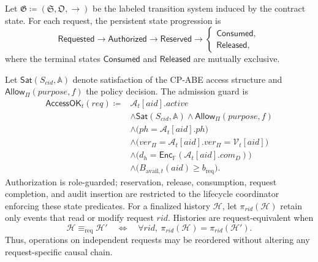 \documentclass[10pt,journal,compsoc]{IEEEtran}
\begin{document}
Let \(\mathfrak{G}\coloneqq(\mathfrak{S},\mathfrak{O},\longrightarrow)\) be the labeled transition system induced by the contract state. For each request, the persistent state progression is
\begin{equation}
\mathsf{Requested}\longrightarrow\mathsf{Authorized}\longrightarrow\mathsf{Reserved}
\longrightarrow
\begin{cases}
\mathsf{Consumed},\\
\mathsf{Released},
\end{cases}
\label{eq:request_state_machine}
\end{equation}
where the terminal states $\mathsf{Consumed}$ and $\mathsf{Released}$ are mutually exclusive.

Let $\mathsf{Sat}(S_{cid},\mathbb{A})$ denote satisfaction of the CP-ABE access structure and $\mathsf{Allow}_{\Pi}(purpose,f)$ the policy decision. The admission guard is
\begin{equation}
\begin{aligned}
\mathsf{AccessOK}_t(req)\coloneqq{}&
\mathcal{A}_t[aid].active\\
&\land\mathsf{Sat}(S_{cid},\mathbb{A})
\land\mathsf{Allow}_{\Pi}(purpose,f)\\
&\land\bigl(ph=\mathcal{A}_t[aid].ph\bigr)\\
&\land\bigl(
ver_{\Pi}
=
\mathcal{A}_t[aid].ver_{\Pi}
=
\mathcal{V}_t[aid]
\bigr)\\
&\land\bigl(
d_h=
\mathsf{Enc}_{\mathbb{F}}
(\mathcal{A}_t[aid].com_D)
\bigr)\\
&\land\bigl(
B_{\mathrm{avail},t}(aid)
\geq b_{\mathrm{req}}
\bigr).
\end{aligned}
\label{eq:access_guard}
\end{equation}
Authorization is role-guarded; reservation, release, consumption, request completion, and audit insertion are restricted to the lifecycle coordinator enforcing these state predicates. For a finalized history $\mathcal{H}$, let $\pi_{rid}(\mathcal{H})$ retain only events that read or modify request $rid$. Histories are request-equivalent when
\begin{equation}
\mathcal{H}\equiv_{\mathrm{req}}\mathcal{H}'
\quad\Longleftrightarrow\quad
\forall rid,\ \pi_{rid}(\mathcal{H})=\pi_{rid}(\mathcal{H}').
\label{eq:request_trace_equivalence}
\end{equation}
Thus, operations on independent requests may be reordered without altering any request-specific causal chain.
\end{document}
